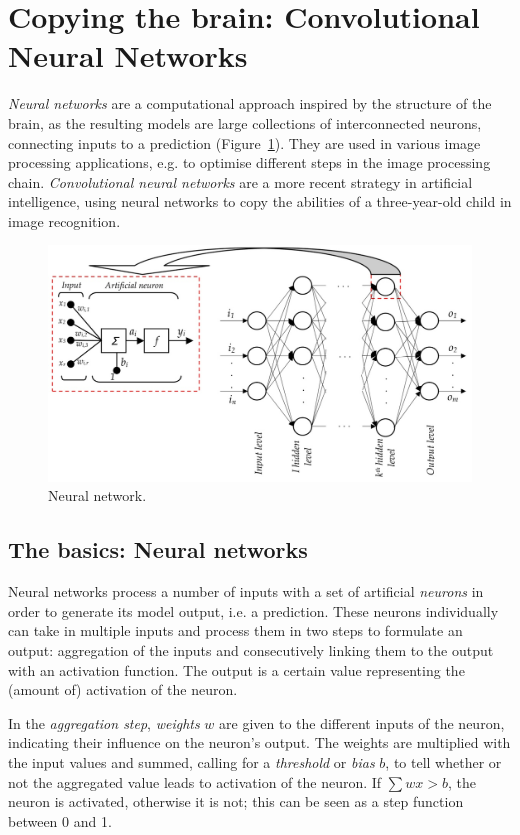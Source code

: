 \section{Copying the brain: Convolutional Neural Networks \label{sec:cnn}}
\textit{Neural networks} are a computational approach inspired by the structure of the brain, as the resulting models are large collections of interconnected neurons, connecting inputs to a prediction (Figure~\ref{fig:ann}). They are used in various image processing applications, e.g. to optimise different steps in the image processing chain. \textit{Convolutional neural networks} are a more recent strategy in artificial intelligence, using neural networks to copy the abilities of a three-year-old child in image recognition.
\begin{figure}[h!]
	\centering
	\includegraphics[width=\textwidth]{../figures/ann_struct}
	\caption{Neural network.
		\label{fig:ann}}
\end{figure}

\subsection{The basics: Neural networks \label{subsec:neural}}
Neural networks process a number of inputs with a set of artificial \textit{neurons} in order to generate its model output, i.e. a prediction. These neurons individually can take in multiple inputs and process them in two steps to formulate an output: aggregation of the inputs and consecutively linking them to the output with an activation function. The output is a certain value representing the (amount of) activation of the neuron. 


In the \textit{aggregation step}, \textit{weights} ${w}$ are given to the different inputs of the neuron, indicating their influence on the neuron\textquoteright s output. The weights are multiplied with the input values and summed, calling for a \textit{threshold} or \textit{bias} ${b}$, to tell whether or not the aggregated value leads to activation of the neuron. If $\sum{{wx}} > {b}$, the neuron is activated, otherwise it is not; this can be seen as a step function between 0 and 1.


